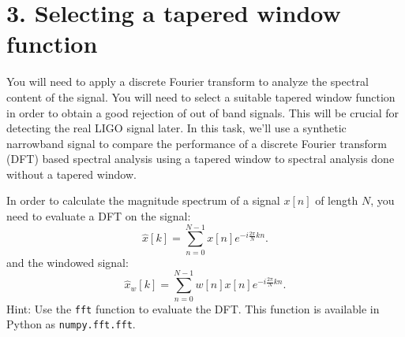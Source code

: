 \section{3. Selecting a tapered window function}

You will need to apply a discrete Fourier transform to analyze the
spectral content of the signal. You will need to select a suitable
tapered window function in order to obtain a good rejection of out of
band signals. This will be crucial for detecting the real LIGO signal
later. In this task, we'll use a synthetic narrowband signal to
compare the performance of a discrete Fourier transform (DFT) based
spectral analysis using a tapered window to spectral analysis done
without a tapered window.

In order to calculate the magnitude spectrum of a signal $x[n]$ of length $N$, you need to evaluate a DFT on the signal:
\begin{equation}
  \hat{x}[k] = \sum_{n=0}^{N-1} x[n] e^{-i\frac{2\pi}{N}kn}.
  \label{one}
\end{equation}
and the windowed signal:
\begin{equation}
  \hat{x}_w[k] = \sum_{n=0}^{N-1} w[n]x[n] e^{-i\frac{2\pi}{N}kn}.
\end{equation}
Hint: Use the \verb|fft| function to evaluate the
DFT. This function is available in Python as \verb|numpy.fft.fft|.


